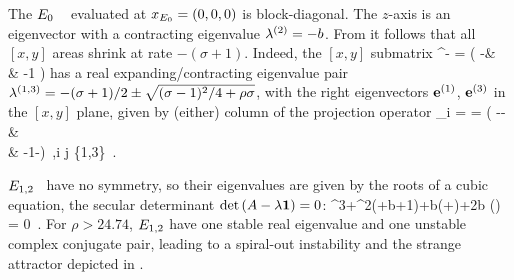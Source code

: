 The $E_{0}$ \eqv\  {\stabmat} 
evaluated at $x_{E_{0}} =(0,0,0)$ is block-diagonal.
The $z$-axis is an eigen\-vector
with a contracting eigenvalue $\eigExp[2]=-b$.
From  it follows that all $[x,y]$ areas
shrink at rate $-(\sigma +1)$. Indeed, the
$[x,y]$ submatrix
\beq
{\Mvar^{-}} =
  \left(
    -\sigma  & \sigma  \\
    \rho     &   -1
    \earr\right)
has a real expanding/contracting eigenvalue pair
$\eigExp[1,3]=
-(\sigma +1)/2 \pm \sqrt{(\sigma-1)^2/4 + \rho \sigma}$,
with the right eigen\-vectors $\jEigvec[1]$,  $\jEigvec[3]$
in the $[x,y]$ plane, given by (either) column of
the projection operator
\beq
{\PP_i} = \frac{\Mvar^{-} -\eigExp[j] \matId}{\eigExp[{i}]-\eigExp[{j}]}
 = 
  \left(
    -\sigma  - \eigExp[{j}] & \sigma  \\
                 \rho   &   -1-\eigExp[{j}]
    \earr\right)
  \,,\qquad i \neq j \in \{1,3\}
  \,.


$\EQV{1,2}$ \eqva\ have no symmetry, so
their eigenvalues are given by
the roots of a cubic equation, the secular determinant
$\det(\Mvar - \Lyap  \matId)=0$:
\beq
     \Lyap^3+\Lyap^2(\sigma+b+1)+\Lyap b(\sigma+\rho)+2\sigma b () = 0
\,.
\label{LorenzEqQigs}
\eeq
For $\rho > 24.74$, $E_{1,2}$ have one stable real eigenvalue and
one unstable complex conjugate pair, %
leading to a spiral-out instability and the strange attractor
depicted in  .


